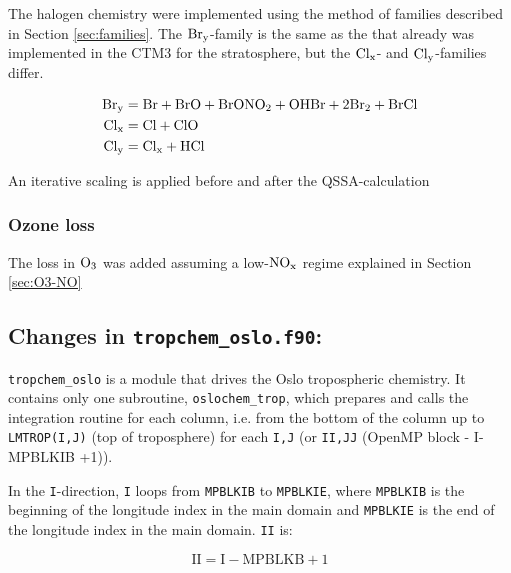 The halogen chemistry were implemented using the method of families described in Section \ref{sec:families}. The $\mathrm{Br_y}$-family is the same as the that already was implemented in the CTM3 for the stratosphere, but the $\mathrm{Cl_x}$- and $\mathrm{Cl_y}$-families differ. 
 
\begin{align*}
    \mathrm{Br_y} &= \mathrm{Br} + \mathrm{BrO} + \mathrm{BrONO_2} + \mathrm{OHBr} + 2\mathrm{Br_2} + \mathrm{BrCl} \\
    \mathrm{Cl_x} &= \mathrm{Cl} + \mathrm{ClO} \\
    \mathrm{Cl_y} &= \mathrm{Cl_x} + \mathrm{HCl}
\end{align*}

An iterative scaling is applied before and after the QSSA-calculation



\subsubsection{Ozone loss}


The loss in $\mathrm{O_3}$ was added assuming a low-$\mathrm{NO_x}$ regime explained in Section \ref{sec:O3-NO}

\subsection{Changes in \texttt{tropchem\_oslo.f90}:}\label{sec:tropchem_oslo}

\texttt{tropchem\_oslo} is a module that drives the Oslo tropospheric chemistry. It contains only one subroutine, \texttt{oslochem\_trop}, which prepares and calls the integration routine for each column, i.e. from the bottom of the column up to \texttt{LMTROP(I,J)} (top of troposphere) for each \texttt{I,J} (or \texttt{II,JJ} (OpenMP block - I-MPBLKIB +1)). 

\medskip

In the \texttt{I}-direction, \texttt{I} loops from \texttt{MPBLKIB} to \texttt{MPBLKIE}, where \texttt{MPBLKIB} is the beginning of the longitude index in the main domain and \texttt{MPBLKIE} is the end of the longitude index in the main domain. \texttt{II} is: 

\begin{equation*}
    \text{II} = \text{I} - \text{MPBLKB} + 1
\end{equation*}

\medskip


